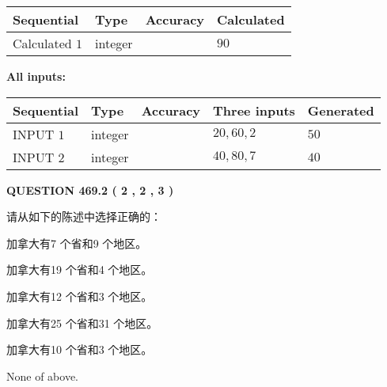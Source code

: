 \documentclass{ctexart}
\begin{document}
   
   
   
\noindent{}
   
   
  
  
\noindent\begin{tabular}{|l|l|l|l|}
\hline
 Sequential & Type & Accuracy & Calculated \\ 
\hline
 
 
  Calculated $  1 $ & integer &  & 
  $ 90 $ 
 \\  \hline  
 \end{tabular}
   
   
   
   
\noindent\vspace{0.1in}\hspace{-0.08in} {\textbf{\Large{All inputs: }}}
   
   
  
  
\noindent\begin{tabular}{|l|l|l|l|l|}
\hline
 Sequential & Type & Accuracy & Three inputs & Generated \\ 
\hline
 
 
  INPUT $  1 $ & integer &  & $
 20
 , 
 60
 , 
 2
 $ & $ 50 $ 
 \\  \hline  
 
 
  INPUT $  2 $ & integer &  & $
 40
 , 
 80
 , 
 7
 $ & $ 40 $ 
 \\  \hline  
 \end{tabular}
   
   
  
\vspace{0.2in}
  
{\textbf{\Large{QUESTION
469.2 
 ( 2 , 2 , 3 )
}}}
  
  
请从如下的陈述中选择正确的：
 
 
加拿大有7 个省和9 个地区。
 
 
加拿大有19 个省和4 个地区。
 
 
加拿大有12 个省和3 个地区。
 
 
加拿大有25 个省和31 个地区。
 
 
加拿大有10 个省和3 个地区。
 
 
 None of above.
 
 
\noindent{}
 
\end{document}
